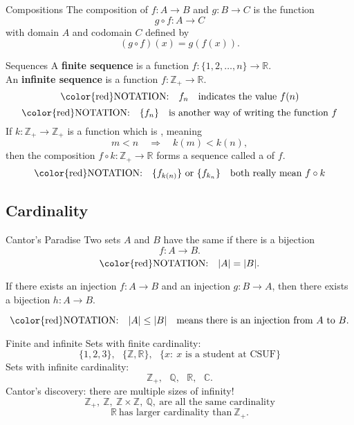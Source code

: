 \documentclass{beamer}
\begin{document}
\begin{frame}{Compositions}
The composition of $f: A\rightarrow B$ and $g: B\rightarrow C$ is the function
\pause
$$g\circ f: A\rightarrow C$$
\pause
with domain $A$ and codomain $C$ defined by
\pause
$$(g\circ f)(x)  = g(f(x)).$$
\end{frame}

\begin{frame}{Sequences}
A \textbf{finite sequence} is a function $f: \{1,2,\dots,n\}\rightarrow \mathbb{R}$.\\
\pause
An \textbf{infinite sequence} is a function $f: \mathbb{Z}_+\rightarrow \mathbb{R}$.\\
\pause
$$\text{\color{red}NOTATION:}\quad f_n\quad\text{indicates the value}\ f(n)$$
\pause
$$\text{\color{red}NOTATION:}\quad \{f_n\}\quad\text{is another way of writing the function}\ f$$
\pause
If $k:\mathbb{Z}_+\rightarrow\mathbb{Z}_+$ is a function which is , meaning
$$m < n\quad\Rightarrow\quad k(m) < k(n),$$
\pause
then the composition $f\circ k: \mathbb{Z}_+\rightarrow \mathbb{R}$ forms a sequence called a  of $f$.
\pause
$$\text{\color{red}NOTATION:}\quad \{f_{k(n)}\}\ \text{or}\ \{f_{k_n}\}\quad\text{both really mean}\ f\circ k$$
\end{frame}

\subsection{Cardinality}

\begin{frame}{Cantor's Paradise}
\pause
Two sets $A$ and $B$ have the same  if there is a bijection
\pause
$$f: A\rightarrow B.$$
\pause
$$\text{\color{red}NOTATION:}\quad \lvert A\rvert = \lvert B\rvert.$$
\pause
\begin{thm}
If there exists an injection $f: A\rightarrow B$ and an injection $g: B\rightarrow A$,
then there exists a bijection $h: A\rightarrow B.$
\end{thm}
\pause
$$\text{\color{red}NOTATION:}\quad \lvert A\rvert \leq \lvert B\rvert\quad\text{means there is an injection from $A$ to $B$}.$$

\end{frame}

\begin{frame}{Finite and infinite}
\pause
Sets with finite cardinality:
$$\{1,2,3\},\ \ \ \{\mathbb{Z},\mathbb{R}\},\ \ \ \{x:\ \text{$x$ is a student at CSUF}\}$$
\pause
Sets with infinite cardinality:
$$\mathbb{Z}_+,\ \ \ \mathbb{Q},\ \ \ \mathbb{R},\ \ \ \mathbb{C}.$$
\pause
Cantor's discovery: there are multiple sizes of infinity!
$$\mathbb{Z}_+,\ \mathbb{Z},\ \mathbb{Z}\times\mathbb{Z},\ \mathbb{Q},\ \text{are all the same cardinality}$$
\pause
$$\mathbb{R}\  \text{has larger cardinality than}\ \mathbb{Z}_+.$$
\end{frame}
\end{document}
